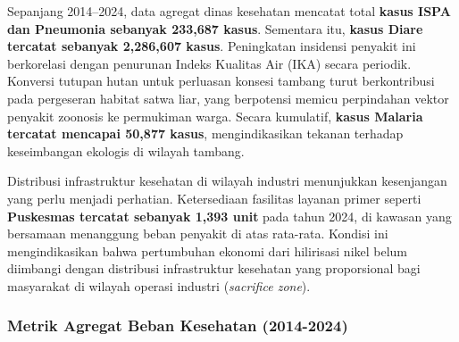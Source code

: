 \documentclass[
]{article}
\begin{document}
Sepanjang 2014--2024, data agregat dinas kesehatan mencatat total
\textbf{kasus ISPA dan Pneumonia sebanyak 233,687 kasus}. Sementara itu,
\textbf{kasus Diare tercatat sebanyak 2,286,607 kasus}. Peningkatan
insidensi penyakit ini berkorelasi dengan penurunan Indeks Kualitas Air
(IKA) secara periodik. Konversi tutupan hutan untuk perluasan konsesi
tambang turut berkontribusi pada pergeseran habitat satwa liar, yang
berpotensi memicu perpindahan vektor penyakit zoonosis ke permukiman
warga. Secara kumulatif, \textbf{kasus Malaria tercatat mencapai 50,877
kasus}, mengindikasikan tekanan terhadap keseimbangan ekologis di
wilayah tambang.

Distribusi infrastruktur kesehatan di wilayah industri menunjukkan
kesenjangan yang perlu menjadi perhatian. Ketersediaan fasilitas layanan
primer seperti \textbf{Puskesmas tercatat sebanyak 1,393 unit} pada
tahun 2024, di kawasan yang bersamaan menanggung beban penyakit di atas
rata-rata. Kondisi ini mengindikasikan bahwa pertumbuhan ekonomi dari
hilirisasi nikel belum diimbangi dengan distribusi infrastruktur
kesehatan yang proporsional bagi masyarakat di wilayah operasi industri
(\emph{sacrifice zone}).

\subsubsection{Metrik Agregat Beban Kesehatan
(2014-2024)}\label{metrik-agregat-beban-kesehatan-2014-2024}
\end{document}
